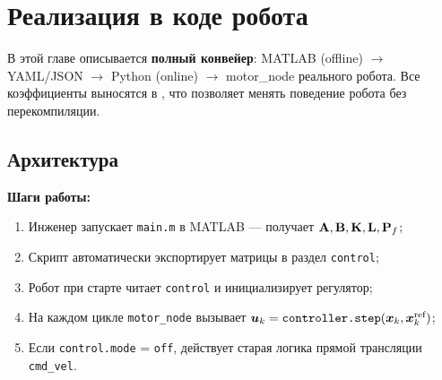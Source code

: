 \chapter{Реализация в коде робота}
\label{ch:implementation}

В этой главе описывается \textbf{полный конвейер}:
\textsf{MATLAB (offline)} $\to$ \textsf{YAML/JSON} $\to$ \textsf{Python (online)}
$\to$ \textsf{motor\_node} реального робота. Все коэффициенты выносятся
в , что позволяет менять поведение робота
без перекомпиляции.

\section{Архитектура}
\label{sec:architecture}

\begin{center}
\end{center}

\textbf{Шаги работы:}
\begin{enumerate}
  \item Инженер запускает \texttt{main.m} в MATLAB --- получает $\mathbf{A}, \mathbf{B}, \mathbf{K}, \mathbf{L}, \mathbf{P}_f$;
  \item Скрипт автоматически экспортирует матрицы в 
        раздел \texttt{control};
  \item Робот при старте читает \texttt{control} и инициализирует регулятор;
  \item На каждом цикле \texttt{motor\_node} вызывает $\bm{u}_k = \texttt{controller.step}(\bm{x}_k, \bm{x}_k^{\text{ref}})$;
  \item Если \texttt{control.mode} = \texttt{off}, действует старая логика
        прямой трансляции \texttt{cmd\_vel}.
\end{enumerate}

